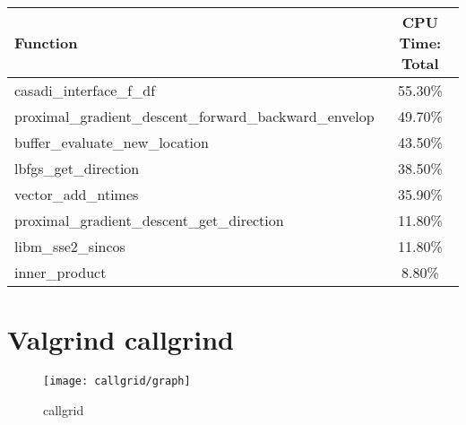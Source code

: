 \begin{center}
	\begin{tabular}{| l | c |}
		\hline
		Function&CPU Time: Total \\
		\hline
		casadi\_interface\_f\_df&55.30\% \\
		proximal\_gradient\_descent\_forward\_backward\_envelop&49.70\% \\
		buffer\_evaluate\_new\_location&43.50\% \\
		lbfgs\_get\_direction&38.50\% \\
		vector\_add\_ntimes&35.90\% \\
		proximal\_gradient\_descent\_get\_direction&11.80\% \\
		libm\_sse2\_sincos&11.80\% \\
		inner\_product&8.80\% \\
		\hline
	\end{tabular}
\end{center}
\section{Valgrind callgrind}

\begin{figure}
	\centering
	\texttt{[image: callgrid/graph]}
	\caption{callgrid}
	\label{fig:callgrid}
\end{figure}